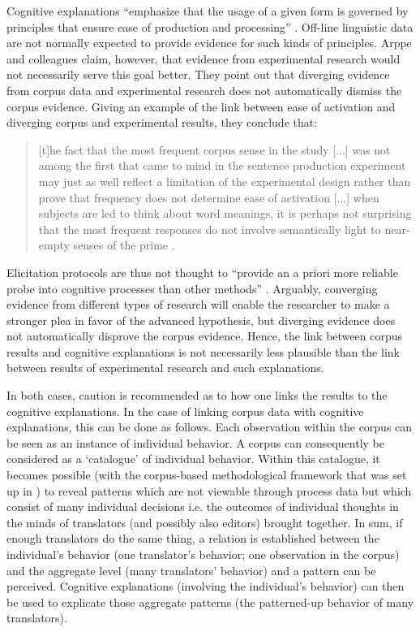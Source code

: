 Cognitive explanations “emphasize that the usage of a given form is governed by principles that ensure ease of production and processing” \citep[20]{arppe_cognitive_2010}. Off-line linguistic data are not normally expected to provide evidence for such kinds of principles. Arppe and colleagues claim, however, that evidence from experimental research would not necessarily serve this goal better. They point out that diverging evidence from corpus data and experimental research does not automatically dismiss the corpus evidence. Giving an example of the link between ease of activation and diverging corpus and experimental results, they conclude that: 

\begin{quote}
[t]he fact that the most frequent corpus sense in the study [...] was not among the first that came to mind in the sentence production experiment may just as well reflect a limitation of the experimental design rather than prove that frequency does not determine ease of activation [...] when subjects are led to think about word meanings, it is perhaps not surprising that the most frequent responses do not involve semantically light to near-empty senses of the prime \citep[11-12]{arppe_cognitive_2010}.
\end{quote}

Elicitation protocols are thus not thought to “provide an a priori more reliable probe into cognitive processes than other methods” \citep[12]{arppe_cognitive_2010}. Arguably, converging evidence from different types of research will enable the researcher to make a stronger plea in favor of the advanced hypothesis, but diverging evidence does not automatically disprove the corpus evidence. Hence, the link between corpus results and cognitive explanations is not necessarily less plausible than the link between results of experimental research and such explanations.

In both cases, caution is recommended as to how one links the results to the cognitive explanations. In the case of linking corpus data with cognitive explanations, this can be done as follows. Each observation within the corpus can be seen as an instance of individual behavior. A corpus can consequently be considered as a ‘catalogue’ of individual behavior. Within this catalogue, it becomes possible (with the corpus-based methodological framework that was set up in ) to reveal patterns which are not viewable through process data but which consist of many individual decisions i.e. the outcomes of individual thoughts in the minds of translators (and possibly also editors) brought together. In sum, if enough translators do the same thing, a relation is established between the individual’s behavior (one translator’s behavior; one observation in the corpus) and the aggregate level (many translators’ behavior) and a pattern can be perceived. Cognitive explanations (involving the individual’s behavior) can then be used to explicate those aggregate patterns (the patterned-up behavior of many translators).

